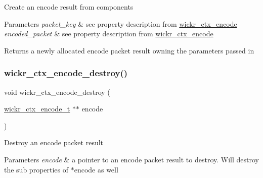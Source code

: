Create an encode result from components


\begin{DoxyParams}{Parameters}
{\em packet\+\_\+key} & see property description from \textquotesingle{}\mbox{\hyperlink{structwickr__ctx__encode}{wickr\+\_\+ctx\+\_\+encode}}\textquotesingle{} \\
\hline
{\em encoded\+\_\+packet} & see property description from \textquotesingle{}\mbox{\hyperlink{structwickr__ctx__encode}{wickr\+\_\+ctx\+\_\+encode}}\textquotesingle{} \\
\hline
\end{DoxyParams}
\begin{DoxyReturn}{Returns}
a newly allocated encode packet result owning the parameters passed in 
\end{DoxyReturn}
\mbox{\label{group__wickr__ctx_ga9ed3f7c0f4d672a2ac562b279e2da4e1}} 
\subsubsection{\texorpdfstring{wickr\+\_\+ctx\+\_\+encode\+\_\+destroy()}{wickr\_ctx\_encode\_destroy()}}
{\footnotesize\ttfamily void wickr\+\_\+ctx\+\_\+encode\+\_\+destroy (\begin{DoxyParamCaption}\item[{\mbox{\hyperlink{structwickr__ctx__encode}{wickr\+\_\+ctx\+\_\+encode\+\_\+t}} $\ast$$\ast$}]{encode }\end{DoxyParamCaption})}

Destroy an encode packet result


\begin{DoxyParams}{Parameters}
{\em encode} & a pointer to an encode packet result to destroy. Will destroy the sub properties of \textquotesingle{}$\ast$encode\textquotesingle{} as well \\
\hline
\end{DoxyParams}
\mbox{\label{group__wickr__ctx_ga3766720fd6654fad791a26cd2c1161b7}} 

